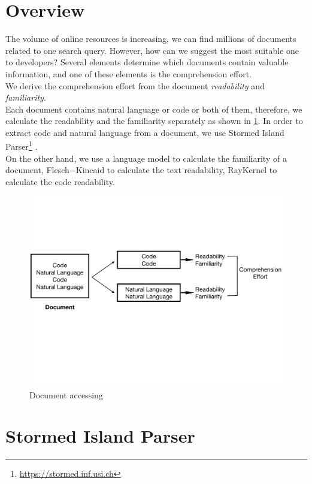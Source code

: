 \documentclass[12pt,mscthesis]{usiinfthesis}
\begin{document}
	
	\section{Overview}
	The volume of online resources is increasing, we can find millions of documents related to one search query. However, how can we suggest the most suitable one to developers? Several elements determine which documents contain valuable information, and one of these elements is the comprehension effort.\\
	We derive the comprehension effort from the document \textit{readability} and \textit{familiarity}.\\

	Each document contains natural language or code or both of them, therefore, we calculate the readability and the familiarity separately as shown in \cref{fig1}. 
	In order to extract code and natural language from a document, we use Stormed Island Parser\footnote{\url{https://stormed.inf.usi.ch}} \cite{Ponz2015a}.\\
	\newpage
	On the other hand, we use a language model to calculate the familiarity of a document, Flesch$-$Kincaid to calculate the text readability, RayKernel \cite{Buse:2010:LMC:1850489.1850615} to calculate the code readability.
	

	\begin{figure}[htbp]
	\centering
	\includegraphics[width=\textwidth]{fig1}
	\caption{Document accessing}
	\label{fig1}
	\end{figure}

	\section{Stormed Island Parser}
\end{document}
